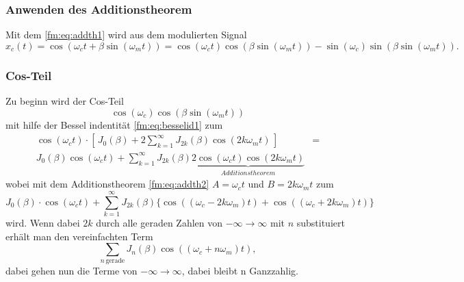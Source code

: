 \subsubsection{Anwenden des Additionstheorem}
Mit dem \eqref{fm:eq:addth1} wird aus dem modulierten Signal
\[
    x_c(t) 
    =
    \cos(\omega_c t + \beta\sin(\omega_mt))
    =
    \cos(\omega_c t)\cos(\beta\sin(\omega_m t))-\sin(\omega_c)\sin(\beta\sin(\omega_m t)).
    \label{fm:eq:start}
\]
\subsubsection{Cos-Teil}
Zu beginn wird der Cos-Teil
\[
    \cos(\omega_c)\cos(\beta\sin(\omega_mt))  
\]
mit hilfe der Bessel indentität \eqref{fm:eq:besselid1} zum
\begin{align*}
    \cos(\omega_c t) \cdot [\, J_0(\beta) + 2\sum_{k=1}^\infty J_{2k}(\beta) \cos(2k\omega_m t)\, ]
    &=\\
    J_0(\beta)\cos(\omega_c t) + \sum_{k=1}^\infty J_{2k}(\beta) 
    \underbrace{2\cos(\omega_c t)\cos(2k\omega_m t)}_{Additionstheorem}
\end{align*}
wobei mit dem Additionstheorem \eqref{fm:eq:addth2} \(A = \omega_c t\) und \(B = 2k\omega_m t \) zum
\[
    J_0(\beta)\cdot \cos(\omega_c t) + \sum_{k=1}^\infty J_{2k}(\beta) \{ \cos((\omega_c - 2k\omega_m) t)+\cos((\omega_c + 2k\omega_m) t) \}
\]
wird.
Wenn dabei \(2k\) durch alle geraden Zahlen von \(-\infty \to \infty\) mit \(n\) substituiert erhält man den vereinfachten Term
\[
    \sum_{n\, \text{gerade}} J_{n}(\beta) \cos((\omega_c + n\omega_m) t),
    \label{fm:eq:gerade}
\]
dabei gehen nun die Terme von \(-\infty \to \infty\), dabei bleibt n Ganzzahlig.

